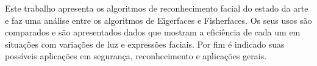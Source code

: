 	Este trabalho apresenta os algoritmos de reconhecimento facial do estado da arte e faz uma análise entre os algoritmos de Eigerfaces e Fisherfaces. Os seus usos são comparados e são apresentados dados que mostram a eficiência de cada um em situações com variações de luz e expressões faciais. Por fim é indicado suas possíveis aplicações em segurança, reconhecimento e aplicações gerais.

